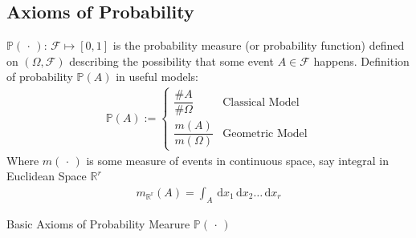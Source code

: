 \subsection{Axioms of Probability}

    $\mathbb{P}(\,\cdot\,):\,\mathscr{F}\mapsto [0,1]$ is the probability measure (or probability function) defined on $(\Omega,\mathscr{F})$ describing the possibility that some event $ A\in\mathscr{F}  $ happens. Definition of probability $ \mathbb{P}(A) $ in useful models:
    \begin{align}
       \mathbb{P}\left( A \right) :=\begin{cases}
            \dfrac{\#A}{\#\Omega }&\text{Classical Model}\\
            \dfrac{m(A)}{m(\Omega )}&\text{Geometric Model}
        \end{cases}   
    \end{align}
    Where $ m(\, \cdot \, ) $ is some measure of events in continuous space, say integral in Euclidean Space $ \mathbb{R}^r $
    \begin{align}
        m_\mathrm{\mathbb{R}^r}(A)=\int_A \,\mathrm{d}x_1\,\mathrm{d}x_2\ldots\,\mathrm{d}x_r  
    \end{align}
    
    
    
    

    
    
    
\begin{point}
    Basic Axioms of Probability Mearure $ \mathbb{P}(\,\cdot\,) $
\end{point}

